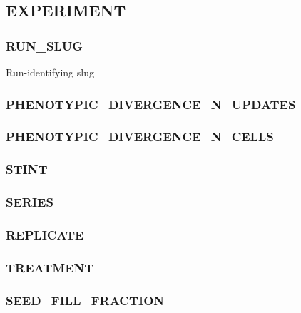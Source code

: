 
\subsection{EXPERIMENT}


\subsubsection{RUN\_SLUG}


Run-identifying slug

\subsubsection{PHENOTYPIC\_DIVERGENCE\_N\_UPDATES}


\subsubsection{PHENOTYPIC\_DIVERGENCE\_N\_CELLS}


\subsubsection{STINT}


\subsubsection{SERIES}


\subsubsection{REPLICATE}


\subsubsection{TREATMENT}


\subsubsection{SEED\_FILL\_FRACTION}

